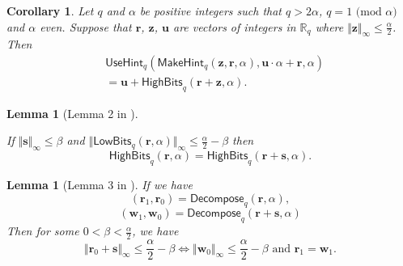 \documentclass[conference]{IEEEtran}
\newtheorem{lemma}[theorem]{Lemma}
\newtheorem{corollary}{Corollary}
\newtheorem{proof}{Proof}
\begin{document}
	\begin{corollary} \label{cor1}
		Let $q$ and $\alpha$ be positive integers such that $q>2\alpha$, $q =1 \text{ (mod } \alpha)$
		and $\alpha$ even. Suppose that $\mathbf{r}$, $\mathbf{z}$, $\mathbf{u}$ are vectors of integers in $\mathbb{R}_q$ where $\Vert \mathbf{z} \Vert_{\infty}\leq \frac{\alpha}{2}$. Then
		\begin{equation*}
		\begin{split}
		&\mathsf{UseHint}_q(\mathsf{MakeHint}_q(\mathbf{z},\mathbf{r},\alpha),\mathbf{u}\cdot \alpha+ \mathbf{r},\alpha)\\
		& =\mathbf{u}+\mathsf{HighBits}_q(\mathbf{r}+\mathbf{z}, \alpha).
		\end{split}
		\end{equation*}
	\end{corollary}
	\iffalse
	\begin{proof}
		Using the definitions of $\mathsf{MakeHint}_q$ and $\mathsf{UseHint}_q$ and Lemma \ref{lem1}(\textit{i}).
		
		To obtain the bit vector $\mathbf{h}:=\mathsf{MakeHint}_q(\mathbf{z},\mathbf{r},\alpha)$, we first compute $\mathbf{r}_1=\mathsf{HighBits}_q(\mathbf{r},\alpha)$ and $\mathbf{v}_1=\mathsf{HighBits}_q(\mathbf{r}+\mathbf{z},\alpha)$ and the we compare $\mathbf{r}_1$ and $\mathbf{v}_1$.
		
		To compute $\mathsf{UseHint}_q(\mathbf{h},\mathbf{u}\cdot \alpha+ \mathbf{r},\alpha)$, we first perform 
		$\mathsf{Decompose}_q(\mathbf{u}\cdot \alpha+\mathbf{r}+\mathbf{z}, \alpha)=(\mathbf{u}_1,\mathbf{u}_0)$.  It is easy to see that to get $\mathbf{u}_1=\mathbf{u}+\mathbf{v}_1$ which is the high-order bits of $\mathbf{u}\cdot \alpha+\mathbf{r}+\mathbf{z}$.

	\end{proof}
	\fi
	\begin{lemma}[Lemma 2 in \cite{DKL+19}] \label{lem10}
		
		If $\Vert \mathbf{s} \Vert_{\infty} \leq \beta$ and $\Vert \mathsf{LowBits}_q(\mathbf{r},\alpha) \Vert_{\infty} \le \frac{\alpha}{2}-\beta$ then
		$$\mathsf{HighBits}_q(\mathbf{r},\alpha)=\mathsf{HighBits}_q(\mathbf{r}+\mathbf{s},\alpha).$$
		
	\end{lemma}
	
	\iffalse
	\begin{lemma}[Lemma 3 in \cite{DKL+19}] \label{lem22}
		If we have $$(\mathbf{r}_1,\mathbf{r}_0)=\mathsf{Decompose}_q(\mathbf{r}, \alpha),$$ 
		$$ (\mathbf{w}_1,\mathbf{w}_0)=\mathsf{Decompose}_q(\mathbf{r}+\mathbf{s}, \alpha)$$
		Then for some $0<\beta<\frac{\alpha}{2}$, we have $$\Vert \mathbf{r}_0+\mathbf{s}\Vert_{\infty}  \leq \frac{\alpha}{2}-\beta\Longleftrightarrow \Vert \mathbf{w}_0\Vert_{\infty} \leq \frac{\alpha}{2}-\beta \text{ and } \mathbf{r}_1=\mathbf{w}_1.$$
		
	\end{lemma}
	
\end{document}
